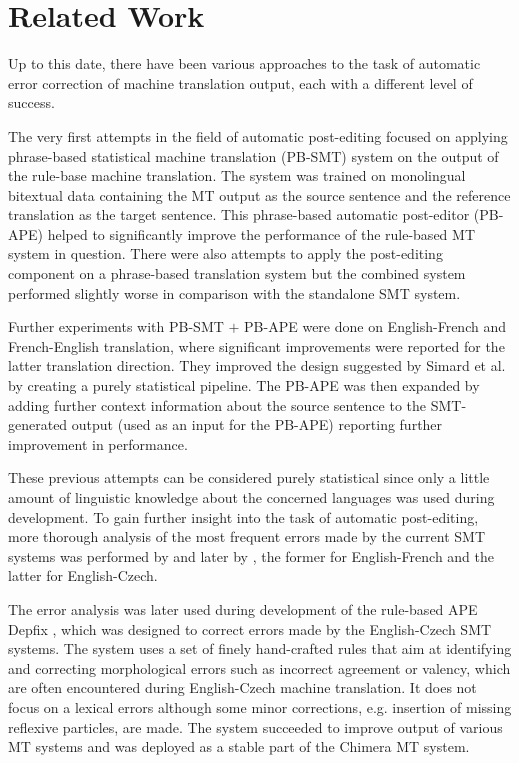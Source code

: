 \section{Related Work}

Up to this date, there have been various approaches to the task of automatic
error correction of machine translation output, each with a different level of success.

The very first attempts in the field of automatic post-editing \citep{simard2007rule}
focused on applying phrase-based statistical machine translation (PB-SMT)
system on the output of the rule-base machine translation. The system was trained on monolingual
bitextual data containing the MT output as the source sentence and the reference translation as
the target sentence. This phrase-based automatic post-editor (PB-APE) helped to significantly improve
the performance of the rule-based MT system in question.
There were also attempts to apply the post-editing component
on a phrase-based translation system but the combined system performed slightly worse in comparison
with the standalone SMT system.

Further experiments with PB-SMT $+$ PB-APE \citep{bechara:2011} were done
on English-French and French-English translation, where significant improvements were reported
for the latter translation direction. They improved the design suggested by Simard et al. by
creating a purely statistical pipeline. The PB-APE was then expanded by adding further 
context information about the source sentence to the SMT-generated output (used as an input for
the PB-APE) reporting further improvement in performance.

These previous attempts can be considered purely statistical since only a little amount of linguistic
knowledge about the concerned languages was used during development. To gain further insight into
the task of automatic post-editing, more thorough analysis of the most frequent errors made by the current
SMT systems was performed by \citet{bechara:master} and later by \citet{biblio:RoAutomaticpostediting2013}, the former
for English-French and the latter for English-Czech.

The error analysis was later used during development of the rule-based APE Depfix \citep{depfix:2014},
which was designed to correct errors made by the English-Czech SMT systems.
The system uses a set of finely hand-crafted rules that aim at identifying
and correcting morphological errors such as incorrect agreement or valency, which are
often encountered during English-Czech machine translation. It does not focus on a lexical errors
although some minor corrections, e.g. insertion of missing reflexive particles, are made. The system
succeeded to improve output of various MT systems and was deployed as a stable part of the
Chimera \citep{biblio:BoRoChimera2013} MT system.

